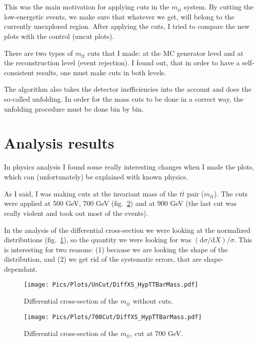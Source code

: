\documentclass[a4paper, 12 pt, titlepage, twocolumn]{article}
\renewcommand{\d}{
	\ensuremath{\mathrm{d}}
}
\newcommand{\ttbar}{
	\ensuremath{t\bar{t}}
}
\begin{document}
This was the main motivation for applying cuts in the $m_{\ttbar}$ system. By cutting the low-energetic events,
we make sure that whatever we get, will belong to the currently unexplored region. After applying the cuts,
I tried to compare the new plots with the control (uncut plots).

There are two types of $m_{\ttbar}$ cuts that I made: at the MC generator level and at the reconstruction
level (event rejection). I found out, that in order to have a self-consistent results, one must make cuts
in both levels.

The algorithm also takes the detector inefficiencies into the account and does the so-called unfolding.
In order for the mass cuts to be done in a correct way, the unfolding procedure must be done bin by bin.

\section{Analysis results}

In physics analysis I found some really interesting changes when I made the plots, which can (unfortunately)
be explained with known physics.

As I said, I was making cuts at the invariant mass of the $\ttbar$ pair ($m_{\ttbar}$). The cuts were applied
at 500 GeV, 700 GeV (fig.~\ref{fig:700cut}) and at 900 GeV (the last cut was really violent and took out most of the events).

In the analysis of the differential cross-section we were looking at the normalized distributions (fig.~\ref{fig:uncut}), so the 
quantity we were looking for was $(\d\sigma/\d X)/\sigma$. This is interesting for two reasons: (1) because
we are looking the shape of the distribution, and (2) we get rid of the systematic errors, that are shape-dependant.

\begin{figure}[H]
	\centering
	\texttt{[image: Pics/Plots/UnCut/DiffXS\_HypTTBarMass.pdf]}
	\vspace{-18pt}
	\caption{Differential cross-section of the $m_{\ttbar}$ without cuts.}
	\label{fig:uncut}
\end{figure}

\begin{figure}[H]
	\centering
	\texttt{[image: Pics/Plots/700Cut/DiffXS\_HypTTBarMass.pdf]}
	\vspace{-12pt}
	\caption{Differential cross-section of the $m_{\ttbar}$, cut at 700 GeV.}
	\label{fig:700cut}
\end{figure}
\end{document}
